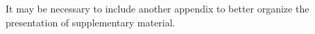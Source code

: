 It may be necessary to include another appendix to better organize the presentation of supplementary material.
